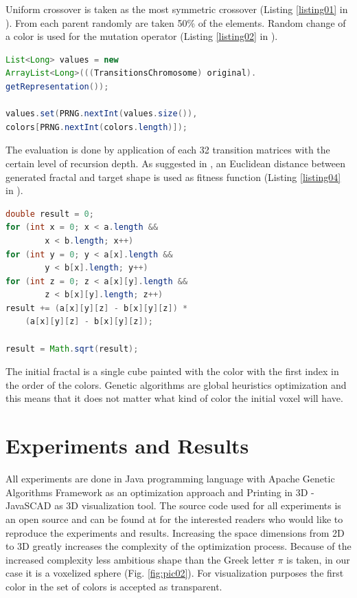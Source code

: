 \documentclass{llncs}
\begin{document}
Uniform crossover is taken as the most symmetric crossover (Listing \ref{listing01} in \cite{balabanov01}). From each parent randomly are taken 50\% of the elements. Random change of a color is used for the mutation operator (Listing \ref{listing02} in \cite{balabanov01}). 

\begin{lstlisting}[language=Java, caption=Color mutation of a single voxel., label=listing02]
List<Long> values = new 
ArrayList<Long>(((TransitionsChromosome) original).
getRepresentation());

values.set(PRNG.nextInt(values.size()), 
colors[PRNG.nextInt(colors.length)]);
\end{lstlisting}

The evaluation is done by application of each 32 transition matrices with the certain level of recursion depth. As suggested in \cite{guerin01}, an Euclidean distance between generated fractal and target shape is used as fitness function (Listing \ref{listing04} in \cite{balabanov01}). 

\begin{lstlisting}[language=Java, caption=Euclidean distance between voxels., label=listing04]
double result = 0;
for (int x = 0; x < a.length && 
		x < b.length; x++)
for (int y = 0; y < a[x].length && 
		y < b[x].length; y++)
for (int z = 0; z < a[x][y].length && 
		z < b[x][y].length; z++)
result += (a[x][y][z] - b[x][y][z]) * 
	(a[x][y][z] - b[x][y][z]);

result = Math.sqrt(result);
\end{lstlisting}

The initial fractal is a single cube painted with the color with the first index in the order of the colors. Genetic algorithms are global heuristics optimization and this means that it does not matter what kind of color the initial voxel will have. 

\section{Experiments and Results} \label{Experiments and Results}

All experiments are done in Java programming language with Apache Genetic Algorithms Framework \cite{apache01} as an optimization approach and Printing in 3D - JavaSCAD \cite{printing01} as 3D visualization tool. The source code used for all experiments is an open source and can be found at \cite{balabanov01} for the interested readers who would like to reproduce the experiments and results. Increasing the space dimensions from 2D to 3D greatly increases the complexity of the optimization process. Because of the increased complexity less ambitious shape than the Greek letter $\pi$ is taken, in our case it is a voxelized sphere (Fig. \ref{fig:pic02}). For visualization purposes the first color in the set of colors is accepted as transparent. 
\end{document}
